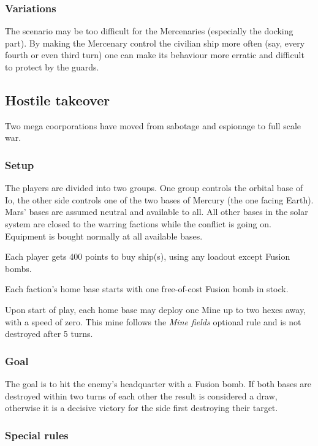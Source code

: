 \documentclass[a4paper,12pt,notitlepage,twocolumn]{article}
\begin{document}
\subsubsection*{Variations}

The scenario may be too difficult for the Mercenaries (especially the
docking part). By making the Mercenary control the civilian ship more
often (say, every fourth or even third turn) one can make its
behaviour more erratic and difficult to protect by the guards. 


\subsection{Hostile takeover}

Two mega coorporations have moved from sabotage and espionage to full
scale war.  

\subsubsection*{Setup}

The players are divided into two groups. One group controls the
orbital base of Io, the other side controls one of the two bases of
Mercury (the one facing Earth). Mars' bases are assumed neutral and
available to all. All other bases in the solar system are closed to
the warring factions while the conflict is going on. Equipment is
bought normally at all available bases. 

Each player gets 400 points to buy ship(s), using any loadout except
Fusion bombs. 

Each faction's home base starts with one free-of-cost Fusion bomb in stock. 

Upon start of play, each home base may deploy one Mine up to two hexes
away, with a speed of zero. This mine follows the \emph{Mine fields}
optional rule and is not destroyed after 5 turns. 

\subsubsection*{Goal}

The goal is to hit the enemy's headquarter with a Fusion bomb. 
If both bases are destroyed within two turns of each other the result
is considered a draw, otherwise it is a decisive victory for the side
first destroying their target.

\subsubsection*{Special rules}
\end{document}

